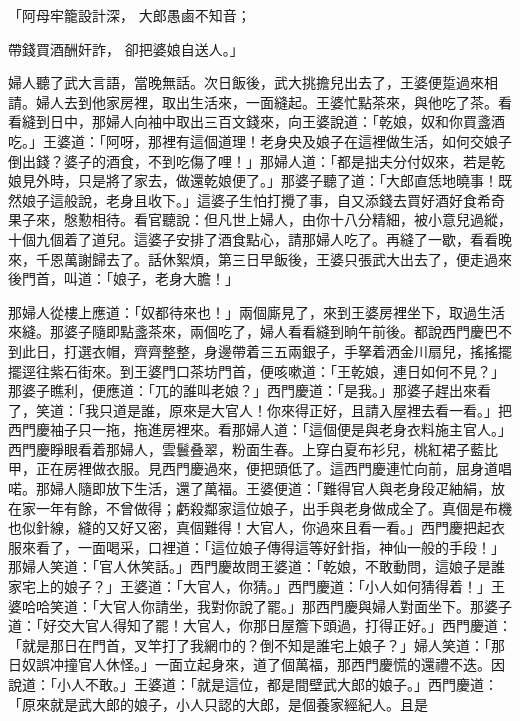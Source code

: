 \begin{showcontents}{}
「阿母牢籠設計深，  大郎愚鹵不知音；

帶錢買酒酬奸詐，  卻把婆娘自送人。」

婦人聽了武大言語，當晚無話。次日飯後，武大挑擔兒出去了，王婆便踅過來相請。婦人去到他家房裡，取出生活來，一面縫起。王婆忙點茶來，與他吃了茶。看看縫到日中，那婦人向袖中取出三百文錢來，向王婆說道：「乾娘，奴和你買盞酒吃。」王婆道：「阿呀，那裡有這個道理！老身央及娘子在這裡做生活，如何交娘子倒出錢？婆子的酒食，不到吃傷了哩！」那婦人道：「都是拙夫分付奴來，若是乾娘見外時，只是將了家去，做還乾娘便了。」那婆子聽了道：「大郎直恁地曉事！既然娘子這般說，老身且收下。」這婆子生怕打攪了事，自又添錢去買好酒好食希奇果子來，慇懃相待。看官聽說：但凡世上婦人，由你十八分精細，被小意兒過縱，十個九個着了道兒。這婆子安排了酒食點心，請那婦人吃了。再縫了一歇，看看晚來，千恩萬謝歸去了。話休絮煩，第三日早飯後，王婆只張武大出去了，便走過來後門首，叫道：「娘子，老身大膽！」

那婦人從樓上應道：「奴都待來也！」兩個廝見了，來到王婆房裡坐下，取過生活來縫。那婆子隨即點盞茶來，兩個吃了，婦人看看縫到晌午前後。都說西門慶巴不到此日，打選衣帽，齊齊整整，身邊帶着三五兩銀子，手拏着洒金川扇兒，搖搖擺擺逕往紫石街來。到王婆門口茶坊門首，便咳嗽道：「王乾娘，連日如何不見？」那婆子瞧利，便應道：「兀的誰叫老娘？」西門慶道：「是我。」那婆子趕出來看了，笑道：「我只道是誰，原來是大官人！你來得正好，且請入屋裡去看一看。」把西門慶袖子只一拖，拖進房裡來。看那婦人道：「這個便是與老身衣料施主官人。」西門慶睜眼看着那婦人，雲鬟叠翠，粉面生春。上穿白夏布衫兒，桃紅裙子藍比甲，正在房裡做衣服。見西門慶過來，便把頭低了。這西門慶連忙向前，屈身道唱喏。那婦人隨即放下生活，還了萬福。王婆便道：「難得官人與老身段疋紬絹，放在家一年有餘，不曾做得；虧殺鄰家這位娘子，出手與老身做成全了。真個是布機也似針線，縫的又好又密，真個難得！大官人，你過來且看一看。」西門慶把起衣服來看了，一面喝采，口裡道：「這位娘子傳得這等好針指，神仙一般的手段！」那婦人笑道：「官人休笑話。」西門慶故問王婆道：「乾娘，不敢動問，這娘子是誰家宅上的娘子？」王婆道：「大官人，你猜。」西門慶道：「小人如何猜得着！」王婆哈哈笑道：「大官人你請坐，我對你說了罷。」那西門慶與婦人對面坐下。那婆子道：「好交大官人得知了罷！大官人，你那日屋簷下頭過，打得正好。」西門慶道：「就是那日在門首，叉竿打了我網巾的？倒不知是誰宅上娘子？」婦人笑道：「那日奴誤冲撞官人休怪。」一面立起身來，道了個萬福，那西門慶慌的還禮不迭。因說道：「小人不敢。」王婆道：「就是這位，都是間壁武大郎的娘子。」西門慶道：「原來就是武大郎的娘子，小人只認的大郎，是個養家經紀人。且是


\end{showcontents}
